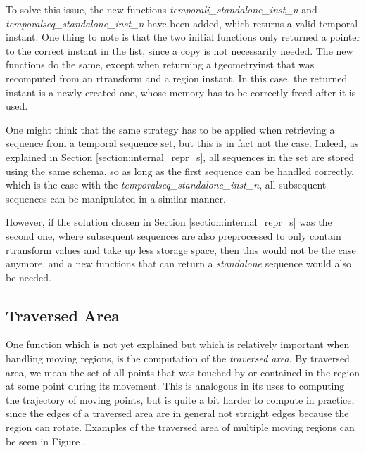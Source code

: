 To solve this issue, the new functions \textit{temporali\_standalone\_inst\_n} and \textit{temporalseq\_standalone\_inst\_n} have been added, which returns a valid temporal instant. One thing to note is that the two initial functions only returned a pointer to the correct instant in the list, since a copy is not necessarily needed. The new functions do the same, except when returning a tgeometryinst that was recomputed from an rtransform and a region instant. In this case, the returned instant is a newly created one, whose memory has to be correctly freed after it is used.


One might think that the same strategy has to be applied when retrieving a sequence from a temporal sequence set, but this is in fact not the case. Indeed, as explained in Section \ref{section:internal_repr_s}, all sequences in the set are stored using the same schema, so as long as the first sequence can be handled correctly, which is the case with the \textit{temporalseq\_standalone\_inst\_n}, all subsequent sequences can be manipulated in a similar manner.

However, if the solution chosen in Section \ref{section:internal_repr_s} was the second one, where subsequent sequences are also preprocessed to only contain rtransform values and take up less storage space, then this would not be the case anymore, and a new functions that can return a \textit{standalone} sequence would also be needed.

\subsection{Traversed Area}
\label{section:traversed_area}

One function which is not yet explained but which is relatively important when handling moving regions, is the computation of the \textit{traversed area}. By traversed area, we mean the set of all points that was touched by or contained in the region at some point during its movement. This is analogous in its uses to computing the trajectory of moving points, but is quite a bit harder to compute in practice, since the edges of a traversed area are in general not straight edges because the region can rotate. Examples of the traversed area of multiple moving regions can be seen in Figure .


